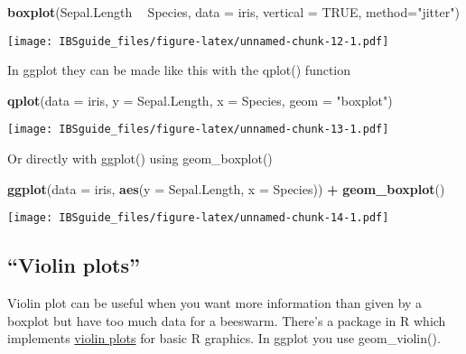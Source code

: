 \documentclass[]{book}
\newenvironment{Shaded}{\begin{snugshade}}{\end{snugshade}}
\newcommand{\KeywordTok}[1]{\textcolor[rgb]{0.13,0.29,0.53}{\textbf{#1}}}
\newcommand{\DataTypeTok}[1]{\textcolor[rgb]{0.13,0.29,0.53}{#1}}
\newcommand{\StringTok}[1]{\textcolor[rgb]{0.31,0.60,0.02}{#1}}
\newcommand{\OtherTok}[1]{\textcolor[rgb]{0.56,0.35,0.01}{#1}}
\newcommand{\OperatorTok}[1]{\textcolor[rgb]{0.81,0.36,0.00}{\textbf{#1}}}
\newcommand{\NormalTok}[1]{#1}
\theoremstyle{definition}
\theoremstyle{definition}
\theoremstyle{definition}
\theoremstyle{remark}
\begin{document}
\begin{Shaded}
\begin{Highlighting}[]
\KeywordTok{boxplot}\NormalTok{(Sepal.Length }\OperatorTok{~}\StringTok{ }\NormalTok{Species, }
           \DataTypeTok{data =}\NormalTok{ iris, }
           \DataTypeTok{vertical =} \OtherTok{TRUE}\NormalTok{, }
           \DataTypeTok{method=}\StringTok{"jitter"}\NormalTok{)}
\end{Highlighting}
\end{Shaded}

\texttt{[image: IBSguide\_files/figure-latex/unnamed-chunk-12-1.pdf]}

In ggplot they can be made like this with the qplot() function

\begin{Shaded}
\begin{Highlighting}[]
\KeywordTok{qplot}\NormalTok{(}\DataTypeTok{data =}\NormalTok{ iris, }
      \DataTypeTok{y =}\NormalTok{ Sepal.Length,}
      \DataTypeTok{x =}\NormalTok{ Species,}
      \DataTypeTok{geom =} \StringTok{"boxplot"}\NormalTok{)}
\end{Highlighting}
\end{Shaded}

\texttt{[image: IBSguide\_files/figure-latex/unnamed-chunk-13-1.pdf]}

Or directly with ggplot() using geom\_boxplot()

\begin{Shaded}
\begin{Highlighting}[]
\KeywordTok{ggplot}\NormalTok{(}\DataTypeTok{data =}\NormalTok{ iris,}
       \KeywordTok{aes}\NormalTok{(}\DataTypeTok{y =}\NormalTok{ Sepal.Length,}
           \DataTypeTok{x =}\NormalTok{ Species)) }\OperatorTok{+}
\StringTok{  }\KeywordTok{geom_boxplot}\NormalTok{()}
\end{Highlighting}
\end{Shaded}

\texttt{[image: IBSguide\_files/figure-latex/unnamed-chunk-14-1.pdf]}

\subsection{\texorpdfstring{``Violin
plots''}{Violin plots}}\label{violin-plots}

Violin plot can be useful when you want more information than given by a
boxplot but have too much data for a beeswarm. There's a package in R
which implements
\href{https://www.statmethods.net/graphs/boxplot.html}{violin plots} for
basic R graphics. In ggplot you use geom\_violin().
\end{document}
